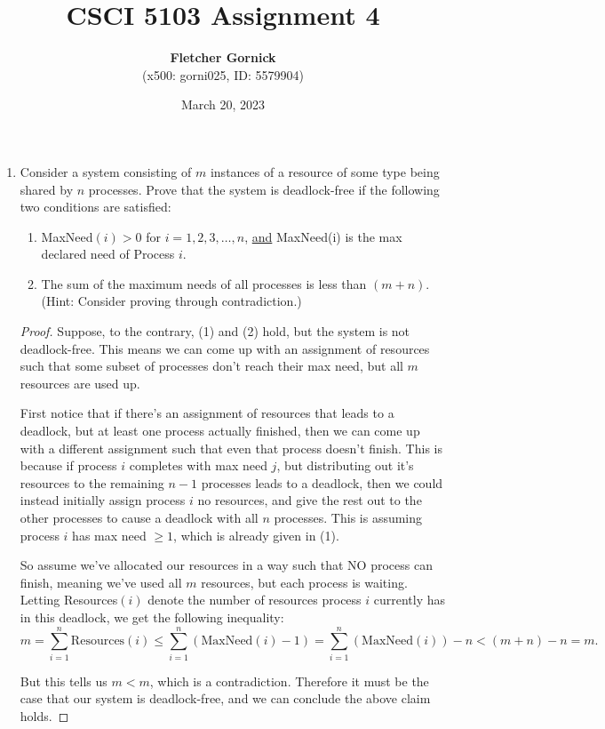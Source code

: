 \documentclass[11pt]{article}
\title{\vspace{-1.0cm}\textbf{CSCI 5103 Assignment 4}}
\date{March 20, 2023}
\author{\textbf{Fletcher Gornick}\\(x500: gorni025, ID: 5579904)}
\newcommand{\n}{\vspace{0.3cm}}
\begin{document}
\maketitle

\begin{enumerate}
  \item Consider a system consisting of \(m\) instances of a resource of some type being shared by \(n\) processes.  Prove that the system is deadlock-free if the following two conditions are satisfied:
    \begin{enumerate}[label=(\arabic*)]
      \item MaxNeed\((i) > 0\) for \(i=1,2,3,\hdots,n\), \underline{and} MaxNeed(i) is the max declared need of Process \(i\).
      \item The sum of the maximum needs of all processes is less than \((m+n)\).  (Hint: Consider proving through contradiction.)
    \end{enumerate}

    \begin{proof}
      Suppose, to the contrary, (1) and (2) hold, but the system is not deadlock-free.  This means we can come up with an assignment of resources such that some subset of processes don't reach their max need, but all \(m\) resources are used up. \n

      First notice that if there's an assignment of resources that leads to a deadlock, but at least one process actually finished, then we can come up with a different assignment such that even that process doesn't finish.  This is because if process \(i\) completes with max need \(j\), but distributing out it's resources to the remaining \(n-1\) processes leads to a deadlock, then we could instead initially assign process \(i\) no resources, and give the rest out to the other processes to cause a deadlock with all \(n\) processes. This is assuming process \(i\) has max need \(\geq 1\), which is already given in (1).\n

      So assume we've allocated our resources in a way such that NO process can finish, meaning we've used all \(m\) resources, but each process is waiting.  Letting Resources\((i)\) denote the number of resources process \(i\) currently has in this deadlock, we get the following inequality:
      \[m = \sum_{i=1}^n \text{Resources}(i) \leq \sum_{i=1}^n (\text{MaxNeed}(i)-1) = \sum_{i=1}^n \left(\text{MaxNeed}(i)\right) - n < (m+n) - n = m.\]

      But this tells us \(m < m\), which is a contradiction.  Therefore it must be the case that our system is deadlock-free, and we can conclude the above claim holds.
    \end{proof}
    


\end{enumerate}
\end{document}
